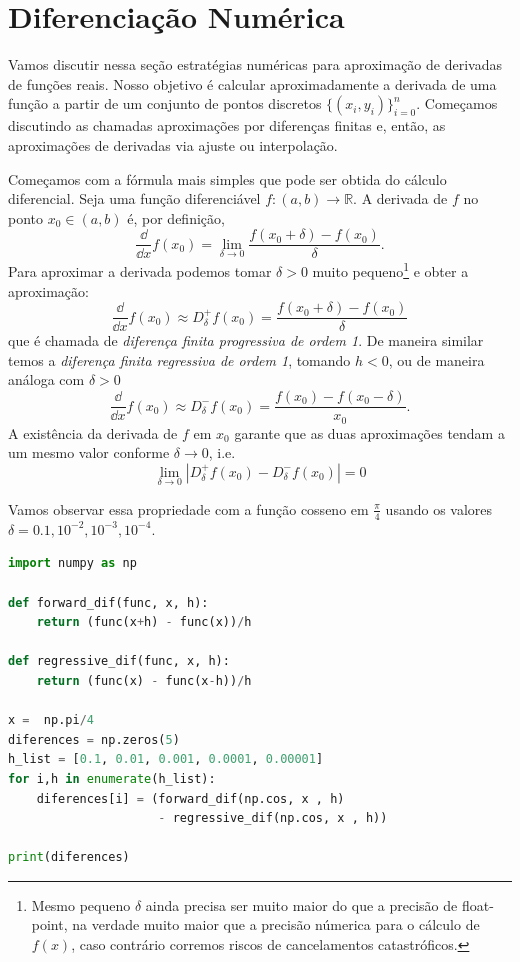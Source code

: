 \section{Diferenciação Numérica}

Vamos discutir nessa seção estratégias numéricas para aproximação de derivadas de funções reais. Nosso objetivo é calcular aproximadamente a derivada de uma função a partir de um conjunto de pontos discretos $\{(x_i,y_i)\}_{i=0}^n$. Começamos discutindo as chamadas aproximações por diferenças finitas e, então, as aproximações de derivadas via ajuste ou interpolação. 

Começamos com a fórmula mais simples que pode ser obtida do cálculo diferencial. Seja  uma função diferenciável $f: (a,b) \to \mathbb{R}$. A derivada de $f$  no ponto $x_0 \in (a,b)$  é, por definição,
\[ \frac{\dd }{\dd x} f(x_0) = \lim_{\delta \to 0} \frac{f(x_0+\delta) - f(x_0)}{\delta}.\]
Para aproximar a derivada podemos tomar $\delta > 0$ muito pequeno\footnote{Mesmo pequeno  $\delta$ ainda precisa ser muito maior do que a precisão de float-point, na verdade muito maior que a precisão númerica para o cálculo de $f(x)$, caso contrário corremos riscos de cancelamentos catastróficos.} e obter a aproximação:
\[\frac{\dd }{\dd x} f(x_0) \approx D^+_\delta f (x_0) = \frac{f(x_0+\delta) - f(x_0)}{\delta}  \]
que é chamada de {\it diferença finita progressiva de ordem 1}. De maneira similar temos a {\it diferença finita regressiva de ordem 1}, tomando $h<0$, ou de maneira análoga com $\delta>0$
\[\frac{\dd }{\dd x} f(x_0) \approx D^-_\delta f (x_0) = \frac{f(x_0) - f(x_0 - \delta)}{x_0}. \]
A existência da derivada de $f$ em $x_0$ garante que as duas aproximações tendam a um mesmo valor conforme $\delta \to 0$, i.e. 
\[ \lim_{\delta \to 0} |D_\delta^+ f(x_0) - D_\delta^- f(x_0) |= 0 \]

Vamos observar essa propriedade com a função cosseno em $\frac{\pi}{4}$ usando os valores
$\delta = 0.1, 10^{-2}, 10^{-3}, 10^{-4}$. 

\begin{lstlisting}[language = Python]
import numpy as np

def forward_dif(func, x, h):
    return (func(x+h) - func(x))/h

def regressive_dif(func, x, h):
    return (func(x) - func(x-h))/h

x =  np.pi/4
diferences = np.zeros(5)
h_list = [0.1, 0.01, 0.001, 0.0001, 0.00001]
for i,h in enumerate(h_list):
    diferences[i] = (forward_dif(np.cos, x , h)
                     - regressive_dif(np.cos, x , h))

print(diferences)
\end{lstlisting}

